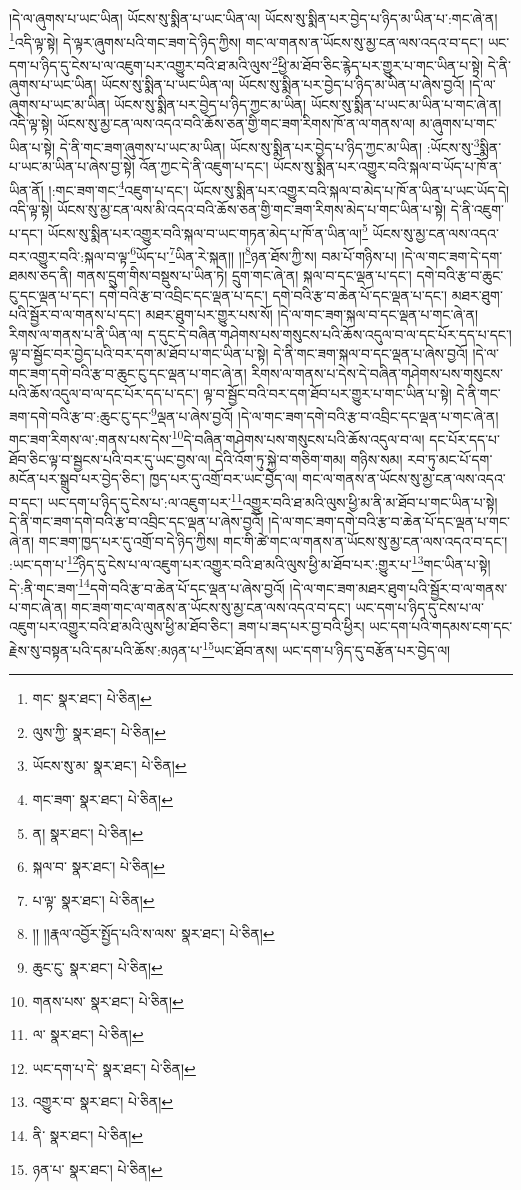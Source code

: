 །དེ་ལ་ཞུགས་པ་ཡང་ཡིན། ཡོངས་སུ་སྨིན་པ་ཡང་ཡིན་ལ། ཡོངས་སུ་སྨིན་པར་བྱེད་པ་ཉིད་མ་ཡིན་པ་:གང་ཞེ་ན། \footnote{གང་  སྣར་ཐང་།  པེ་ཅིན། }འདི་ལྟ་སྟེ། དེ་ལྟར་ཞུགས་པའི་གང་ཟག་དེ་ཉིད་ཀྱིས། གང་ལ་གནས་ན་ཡོངས་སུ་མྱ་ངན་ལས་འདའ་བ་དང་། ཡང་དག་པ་ཉིད་དུ་ངེས་པ་ལ་འཇུག་པར་འགྱུར་བའི་ཐ་མའི་ལུས་\footnote{ལུས་ཀྱི་  སྣར་ཐང་།  པེ་ཅིན། }ཕྱི་མ་ཐོབ་ཅིང་རྙེད་པར་གྱུར་པ་གང་ཡིན་པ་སྟེ། དེ་ནི་ཞུགས་པ་ཡང་ཡིན། ཡོངས་སུ་སྨིན་པ་ཡང་ཡིན་ལ། ཡོངས་སུ་སྨིན་པར་བྱེད་པ་ཉིད་མ་ཡིན་པ་ཞེས་བྱའོ། །དེ་ལ་ཞུགས་པ་ཡང་མ་ཡིན། ཡོངས་སུ་སྨིན་པར་བྱེད་པ་ཉིད་ཀྱང་མ་ཡིན། ཡོངས་སུ་སྨིན་པ་ཡང་མ་ཡིན་པ་གང་ཞེ་ན། འདི་ལྟ་སྟེ། ཡོངས་སུ་མྱ་ངན་ལས་འདའ་བའི་ཆོས་ཅན་གྱི་གང་ཟག་རིགས་ཁོ་ན་ལ་གནས་ལ། མ་ཞུགས་པ་གང་ཡིན་པ་སྟེ། དེ་ནི་གང་ཟག་ཞུགས་པ་ཡང་མ་ཡིན། ཡོངས་སུ་སྨིན་པར་བྱེད་པ་ཉིད་ཀྱང་མ་ཡིན། :ཡོངས་སུ་\footnote{ཡོངས་སུ་མ་  སྣར་ཐང་།  པེ་ཅིན། }སྨིན་པ་ཡང་མ་ཡིན་པ་ཞེས་བྱ་སྟེ། འོན་ཀྱང་དེ་ནི་འཇུག་པ་དང་། ཡོངས་སུ་སྨིན་པར་འགྱུར་བའི་སྐལ་བ་ཡོད་པ་ཁོ་ན་ཡིན་ནོ། །:གང་ཟག་གང་\footnote{གང་ཟག་  སྣར་ཐང་།  པེ་ཅིན། }འཇུག་པ་དང་། ཡོངས་སུ་སྨིན་པར་འགྱུར་བའི་སྐལ་བ་མེད་པ་ཁོ་ན་ཡིན་པ་ཡང་ཡོད་དེ། འདི་ལྟ་སྟེ། ཡོངས་སུ་མྱ་ངན་ལས་མི་འདའ་བའི་ཆོས་ཅན་གྱི་གང་ཟག་རིགས་མེད་པ་གང་ཡིན་པ་སྟེ། དེ་ནི་འཇུག་པ་དང་། ཡོངས་སུ་སྨིན་པར་འགྱུར་བའི་སྐལ་བ་ཡང་གཏན་མེད་པ་ཁོ་ན་ཡིན་ལ།\footnote{ན།  སྣར་ཐང་།  པེ་ཅིན། } ཡོངས་སུ་མྱ་ངན་ལས་འདའ་བར་འགྱུར་བའི་:སྐལ་བ་ལྟ་\footnote{སྐལ་བ་  སྣར་ཐང་།  པེ་ཅིན། }ཡོད་པ་\footnote{པ་ལྟ་  སྣར་ཐང་།  པེ་ཅིན། }ཡིན་རེ་སྐན།། །།\footnote{།། །།རྣལ་འབྱོར་སྤྱོད་པའི་ས་ལས་  སྣར་ཐང་།  པེ་ཅིན། }ཉན་ཐོས་ཀྱི་ས། བམ་པོ་གཉིས་པ། །དེ་ལ་གང་ཟག་དེ་དག་ཐམས་ཅད་ནི། གནས་དྲུག་གིས་བསྡུས་པ་ཡིན་ཏེ། དྲུག་གང་ཞེ་ན། སྐལ་བ་དང་ལྡན་པ་དང་། དགེ་བའི་རྩ་བ་ཆུང་ངུ་དང་ལྡན་པ་དང་། དགེ་བའི་རྩ་བ་འབྲིང་དང་ལྡན་པ་དང་། དགེ་བའི་རྩ་བ་ཆེན་པོ་དང་ལྡན་པ་དང་། མཐར་ཐུག་པའི་སྦྱོར་བ་ལ་གནས་པ་དང་། མཐར་ཐུག་པར་གྱུར་པས་སོ། །དེ་ལ་གང་ཟག་སྐལ་བ་དང་ལྡན་པ་གང་ཞེ་ན། རིགས་ལ་གནས་པ་ནི་ཡིན་ལ། ད་དུང་དེ་བཞིན་གཤེགས་པས་གསུངས་པའི་ཆོས་འདུལ་བ་ལ་དང་པོར་དད་པ་དང་། ལྟ་བ་སྦྱོང་བར་བྱེད་པའི་བར་དག་མ་ཐོབ་པ་གང་ཡིན་པ་སྟེ། དེ་ནི་གང་ཟག་སྐལ་བ་དང་ལྡན་པ་ཞེས་བྱའོ། །དེ་ལ་གང་ཟག་དགེ་བའི་རྩ་བ་ཆུང་ངུ་དང་ལྡན་པ་གང་ཞེ་ན། རིགས་ལ་གནས་པ་དེས་དེ་བཞིན་གཤེགས་པས་གསུངས་པའི་ཆོས་འདུལ་བ་ལ་དང་པོར་དད་པ་དང་། ལྟ་བ་སྦྱོང་བའི་བར་དག་ཐོབ་པར་གྱུར་པ་གང་ཡིན་པ་སྟེ། དེ་ནི་གང་ཟག་དགེ་བའི་རྩ་བ་:ཆུང་ངུ་དང་\footnote{ཆུང་ངུ་  སྣར་ཐང་།  པེ་ཅིན། }ལྡན་པ་ཞེས་བྱའོ། །དེ་ལ་གང་ཟག་དགེ་བའི་རྩ་བ་འབྲིང་དང་ལྡན་པ་གང་ཞེ་ན། གང་ཟག་རིགས་ལ་:གནས་པས་དེས་\footnote{གནས་པས་  སྣར་ཐང་།  པེ་ཅིན། }དེ་བཞིན་གཤེགས་པས་གསུངས་པའི་ཆོས་འདུལ་བ་ལ། དང་པོར་དད་པ་ཐོབ་ཅིང་ལྟ་བ་སྦྱངས་པའི་བར་དུ་ཡང་བྱས་ལ། དེའི་འོག་ཏུ་སྐྱེ་བ་གཅིག་གམ། གཉིས་སམ། རབ་ཏུ་མང་པོ་དག་མངོན་པར་སྒྲུབ་པར་བྱེད་ཅིང་། ཁྱད་པར་དུ་འགྲོ་བར་ཡང་བྱེད་ལ། གང་ལ་གནས་ན་ཡོངས་སུ་མྱ་ངན་ལས་འདའ་བ་དང་། ཡང་དག་པ་ཉིད་དུ་ངེས་པ་:ལ་འཇུག་པར་\footnote{ལ་  སྣར་ཐང་།  པེ་ཅིན། }འགྱུར་བའི་ཐ་མའི་ལུས་ཕྱི་མ་ནི་མ་ཐོབ་པ་གང་ཡིན་པ་སྟེ། དེ་ནི་གང་ཟག་དགེ་བའི་རྩ་བ་འབྲིང་དང་ལྡན་པ་ཞེས་བྱའོ། །དེ་ལ་གང་ཟག་དགེ་བའི་རྩ་བ་ཆེན་པོ་དང་ལྡན་པ་གང་ཞེ་ན། གང་ཟག་ཁྱད་པར་དུ་འགྲོ་བ་དེ་ཉིད་ཀྱིས། གང་གི་ཚེ་གང་ལ་གནས་ན་ཡོངས་སུ་མྱ་ངན་ལས་འདའ་བ་དང་། :ཡང་དག་པ་\footnote{ཡང་དག་པ་དེ་  སྣར་ཐང་།  པེ་ཅིན། }ཉིད་དུ་ངེས་པ་ལ་འཇུག་པར་འགྱུར་བའི་ཐ་མའི་ལུས་ཕྱི་མ་ཐོབ་པར་:གྱུར་པ་\footnote{འགྱུར་བ་  སྣར་ཐང་།  པེ་ཅིན། }གང་ཡིན་པ་སྟེ། དེ་:ནི་གང་ཟག་\footnote{ནི་  སྣར་ཐང་།  པེ་ཅིན། }དགེ་བའི་རྩ་བ་ཆེན་པོ་དང་ལྡན་པ་ཞེས་བྱའོ། །དེ་ལ་གང་ཟག་མཐར་ཐུག་པའི་སྦྱོར་བ་ལ་གནས་པ་གང་ཞེ་ན། གང་ཟག་གང་ལ་གནས་ན་ཡོངས་སུ་མྱ་ངན་ལས་འདའ་བ་དང་། ཡང་དག་པ་ཉིད་དུ་ངེས་པ་ལ་འཇུག་པར་འགྱུར་བའི་ཐ་མའི་ལུས་ཕྱི་མ་ཐོབ་ཅིང་། ཟག་པ་ཟད་པར་བྱ་བའི་ཕྱིར། ཡང་དག་པའི་གདམས་ངག་དང་རྗེས་སུ་བསྟན་པའི་དམ་པའི་ཆོས་:མཉན་པ་\footnote{ཉན་པ་  སྣར་ཐང་།  པེ་ཅིན། }ཡང་ཐོབ་ནས། ཡང་དག་པ་ཉིད་དུ་བརྩོན་པར་བྱེད་ལ། 